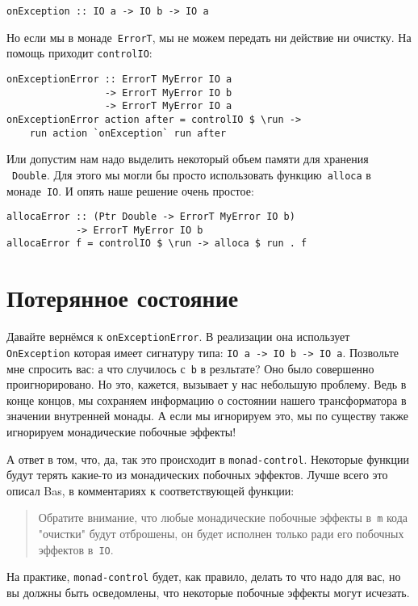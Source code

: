 \begin{lstlisting}
onException :: IO a -> IO b -> IO a
\end{lstlisting}

Но если мы в монаде~\lstinline'ErrorT', мы не можем передать ни действие ни очистку. На
помощь приходит \lstinline'controlIO':

\begin{lstlisting}
onExceptionError :: ErrorT MyError IO a
                 -> ErrorT MyError IO b
                 -> ErrorT MyError IO a
onExceptionError action after = controlIO $ \run ->
    run action `onException` run after
\end{lstlisting}

Или допустим нам надо выделить некоторый объем памяти для хранения ~\lstinline'Double'. Для
этого мы могли бы просто использовать функцию~\lstinline'alloca' в монаде~\lstinline'IO'. И опять наше
решение очень простое:

\begin{lstlisting}
allocaError :: (Ptr Double -> ErrorT MyError IO b)
            -> ErrorT MyError IO b
allocaError f = controlIO $ \run -> alloca $ run . f
\end{lstlisting}

\section{Потерянное состояние}
Давайте вернёмся к \lstinline'onExceptionError'. В реализации она использует \lstinline'OnException'
которая имеет сигнатуру типа: \lstinline'IO a -> IO b -> IO a'. Позвольте мне спросить вас:
а что случилось с~\lstinline'b' в резльтате? Оно было совершенно проигнорировано. Но это,
кажется, вызывает у нас небольшую проблему. Ведь в конце концов, мы сохраняем
информацию о состоянии нашего трансформатора в значении внутренней монады. А
если мы игнорируем это, мы по существу также игнорируем монадические побочные
эффекты!

А ответ в том, что, да, так это происходит в \texttt{monad-control}. Некоторые функции
будут терять какие-то из монадических побочных эффектов. Лучше всего это описал
Bas, в комментариях к соответствующей функции:
\begin{quote}
Обратите внимание, что любые монадические побочные эффекты в~\lstinline'm' кода "очистки"
будут отброшены, он будет исполнен только ради его побочных эффектов в~\lstinline'IO'.
\end{quote}
На практике, \texttt{monad-control} будет, как правило, делать то что надо для вас, но
вы должны быть осведомлены, что некоторые побочные эффекты могут исчезать.

